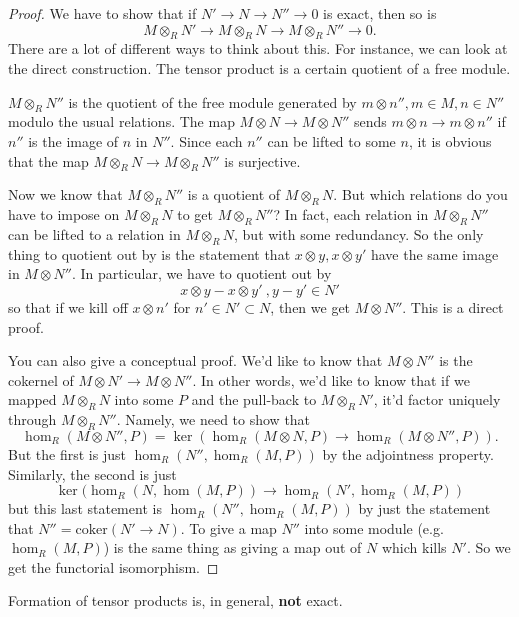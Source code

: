 \begin{proof}
We have to show that if $N' \to N \to N'' \to 0$ is exact, then so is
\[ M \otimes_R N' \to M \otimes_R N \to M \otimes_R N'' \to 0.	\]
There are a lot of different ways to think about this. For instance, we can
look at the direct construction.  The tensor product is a certain quotient of a
free module.

$M \otimes_R N''$ is the quotient of the free module generated by $m \otimes
n'', m \in M, n \in N''$ modulo the usual relations.  The map $M \otimes N \to
M \otimes N''$ sends $m \otimes n \to m \otimes n''$ if $n'' $ is the image of
$n$ in $N''$. Since each $n''$ can be lifted to some $n$, it is obvious that
the map $M \otimes_R N \to M \otimes_R N''$ is surjective.

Now we know that $M \otimes_R N''$ is a quotient of $M \otimes_R N$. But which
relations do you have to impose on $M \otimes_R N$ to get $M \otimes_R
N''$? In fact, each relation in $M \otimes_R N''$
can be lifted to a relation in $M \otimes_R N$, but with some redundancy. So
the only thing to quotient
out by is the statement that $x \otimes y, x \otimes y'$ have the same image in
$M \otimes N''$.  In particular, we have to quotient out by
\[ x \otimes y - x\otimes y' \ , y - y' \in N'	 \]
so that if we kill off $x \otimes n'$ for $n' \in N' \subset N$, then we get $M
\otimes N''$. This is a direct proof.

You can also give a conceptual proof.  We'd like to know that $M \otimes N''$
is the cokernel of $M \otimes N' \to M \otimes N''$. In other words, we'd like
to know that if we mapped $M \otimes_R N$ into some $P$ and the pull-back to $M
\otimes_R N'$, it'd factor uniquely through $M \otimes_R N''$.
Namely, we need to show that
\[ \hom_R(M \otimes N'', P) = \ker(\hom_R(M \otimes N, P) \to \hom_R(M
\otimes N'', P)).  \]
But the first is just $\hom_R(N'', \hom_R(M,P))$ by the adjointness property.
Similarly, the second is just
\[ \ker( \hom_R(N, \hom(M,P)) \to \hom_R(N', \hom_R(M,P))  \]
but this last statement is $\hom_R(N'', \hom_R(M,P))$ by just the statement
that $N'' = \mathrm{coker}(N ' \to N)$.
To give a map $N'' $ into some module (e.g. $\hom_R(M,P)$) is the same thing as
giving a map out of $N$ which kills $N'$.
So we get the functorial isomorphism.
\end{proof}

\begin{remark}
Formation of tensor products is, in general, \textbf{not} exact.
\end{remark}

